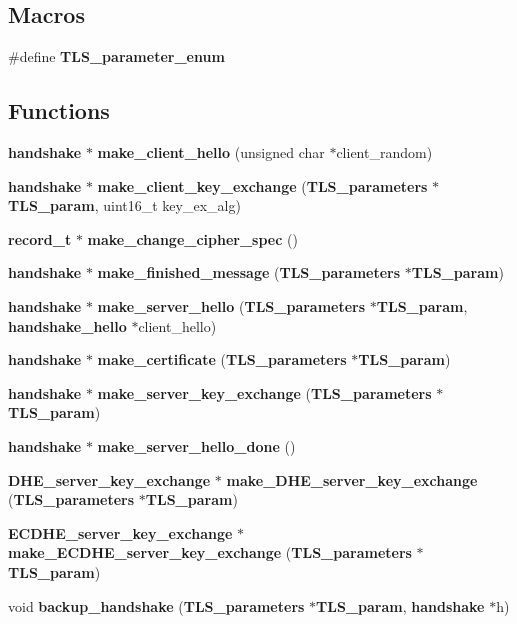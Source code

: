\subsection*{Macros}
\begin{DoxyCompactItemize}
\item 
\#define {\bf T\+L\+S\+\_\+parameter\+\_\+enum}
\end{DoxyCompactItemize}
\subsection*{Functions}
\begin{DoxyCompactItemize}
\item 
{\bf handshake} $\ast$ {\bf make\+\_\+client\+\_\+hello} (unsigned char $\ast$client\+\_\+random)
\item 
{\bf handshake} $\ast$ {\bf make\+\_\+client\+\_\+key\+\_\+exchange} ({\bf T\+L\+S\+\_\+parameters} $\ast${\bf T\+L\+S\+\_\+param}, uint16\+\_\+t key\+\_\+ex\+\_\+alg)
\item 
{\bf record\+\_\+t} $\ast$ {\bf make\+\_\+change\+\_\+cipher\+\_\+spec} ()
\item 
{\bf handshake} $\ast$ {\bf make\+\_\+finished\+\_\+message} ({\bf T\+L\+S\+\_\+parameters} $\ast${\bf T\+L\+S\+\_\+param})
\item 
{\bf handshake} $\ast$ {\bf make\+\_\+server\+\_\+hello} ({\bf T\+L\+S\+\_\+parameters} $\ast${\bf T\+L\+S\+\_\+param}, {\bf handshake\+\_\+hello} $\ast$client\+\_\+hello)
\item 
{\bf handshake} $\ast$ {\bf make\+\_\+certificate} ({\bf T\+L\+S\+\_\+parameters} $\ast${\bf T\+L\+S\+\_\+param})
\item 
{\bf handshake} $\ast$ {\bf make\+\_\+server\+\_\+key\+\_\+exchange} ({\bf T\+L\+S\+\_\+parameters} $\ast${\bf T\+L\+S\+\_\+param})
\item 
{\bf handshake} $\ast$ {\bf make\+\_\+server\+\_\+hello\+\_\+done} ()
\item 
{\bf D\+H\+E\+\_\+server\+\_\+key\+\_\+exchange} $\ast$ {\bf make\+\_\+\+D\+H\+E\+\_\+server\+\_\+key\+\_\+exchange} ({\bf T\+L\+S\+\_\+parameters} $\ast${\bf T\+L\+S\+\_\+param})
\item 
{\bf E\+C\+D\+H\+E\+\_\+server\+\_\+key\+\_\+exchange} $\ast$ {\bf make\+\_\+\+E\+C\+D\+H\+E\+\_\+server\+\_\+key\+\_\+exchange} ({\bf T\+L\+S\+\_\+parameters} $\ast${\bf T\+L\+S\+\_\+param})
\item 
void {\bf backup\+\_\+handshake} ({\bf T\+L\+S\+\_\+parameters} $\ast${\bf T\+L\+S\+\_\+param}, {\bf handshake} $\ast$h)
\end{DoxyCompactItemize}



